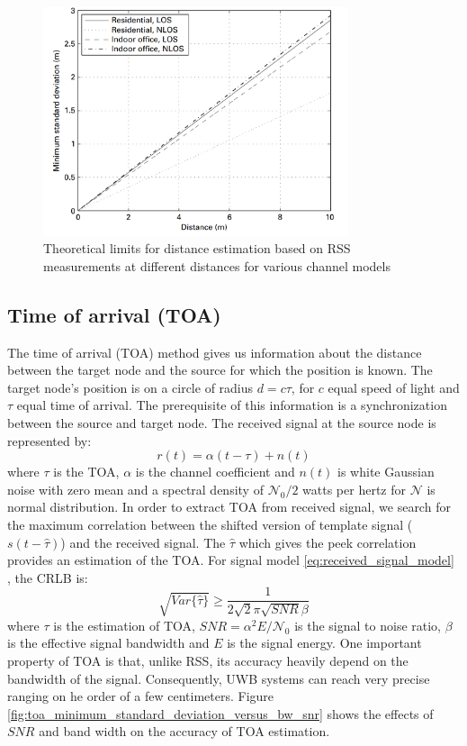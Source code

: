 \documentclass[\main/main.tex]{subfiles}
\begin{document}
\begin{figure}[htbp]
    \centering
    \includegraphics[width=0.8\textwidth]{limits_for_distance_estimation_based_on_rss_measurements}
    \caption{Theoretical limits for distance estimation based on RSS measurements at different distances for various channel models}
    \label{fig:limits_for_distance_estimation_based_on_rss_measurements}
\end{figure}

\subsection{Time of arrival (TOA)}

The time of arrival (TOA) method gives us information about the distance between the target node and the source for which the position is known. The target node's position is on a circle of radius $d=c\tau$, for $c$ equal speed of light and $\tau$ equal time of arrival. The prerequisite of this information is a synchronization between the source and target node. The received signal at the source node is represented by:
\begin{equation}
    r(t) = \alpha(t-\tau) + n(t)
\end{equation}
where $\tau$ is the TOA, $\alpha$ is the channel coefficient and $n(t)$ is white Gaussian noise with zero mean and a spectral density of $\mathcal{N}_0/2$ watts per hertz for $\mathcal{N}$ is normal distribution. In order to extract TOA from received signal, we search for the maximum correlation between the shifted version of template signal ($s(t-\hat{\tau})$) and the received signal. The $\hat{\tau}$ which gives the peek correlation provides an estimation of the TOA. For signal model \ref{eq:received_signal_model} , the CRLB is:
\begin{equation}
    \sqrt{Var\{\hat{\tau}\}} \geq \frac{1}{2\sqrt{2}\pi\sqrt{SNR}\beta}
\end{equation}
where $\tau$ is the estimation of TOA, $SNR = \alpha^2 E / \mathcal{N}_0$ is the signal to noise ratio, $\beta$ is the effective signal bandwidth and $E$ is the signal energy. One important property of TOA is that, unlike RSS, its accuracy heavily depend on the bandwidth of the signal. Consequently, UWB systems can reach very precise ranging on he order of a few centimeters. Figure \ref{fig:toa_minimum_standard_deviation_versus_bw_snr} shows the effects of $SNR$ and band width on the accuracy of TOA estimation.
\end{document}
